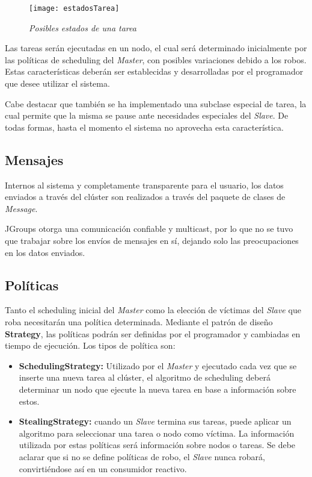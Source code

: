 \documentclass[12pt,a4paper,oneside,spanish]{report}
\begin{document}
\begin{figure}
\texttt{[image: estadosTarea]}
\caption{\textit{Posibles estados de una tarea}}
\label{fig:estadosTarea}
\end{figure}

Las tareas serán ejecutadas en un nodo, el cual será determinado inicialmente por las políticas de scheduling del \textit{Master}, con posibles variaciones debido a los robos. Estas características deberán ser establecidas y desarrolladas por el programador que desee utilizar el sistema.

Cabe destacar que también se ha implementado una subclase especial de tarea, la cual permite que la misma se pause ante necesidades especiales del \textit{Slave}. De todas formas, hasta el momento el sistema no aprovecha esta característica.

\subsection*{Mensajes}

Internos al sistema y completamente transparente para el usuario, los datos enviados a través del clúster son realizados a través del paquete de clases de \textit{Message}.

JGroups otorga una comunicación confiable y multicast, por lo que no se tuvo que trabajar sobre los envíos de mensajes en sí, dejando solo las preocupaciones en los datos enviados.


\subsection*{Políticas}

Tanto el scheduling inicial del \textit{Master} como la elección de víctimas del \textit{Slave} que roba necesitarán una política determinada. Mediante el patrón de diseño \textbf{Strategy}, las políticas podrán ser definidas por el programador y cambiadas en tiempo de ejecución. Los tipos de política son:

\begin{itemize}
	\item \textbf{SchedulingStrategy:} Utilizado por el \textit{Master} y ejecutado cada vez que se inserte una nueva tarea al clúster, el algoritmo de scheduling deberá determinar un nodo que ejecute la nueva tarea en base a información sobre estos.
	\item \textbf{StealingStrategy:} cuando un \textit{Slave} termina sus tareas, puede aplicar un algoritmo para seleccionar una tarea o nodo como víctima. La información utilizada por estas políticas será información sobre nodos o tareas. 
Se debe aclarar que si no se define políticas de robo, el \textit{Slave} nunca robará, convirtiéndose así en un consumidor reactivo.
\end{itemize}
\end{document}

